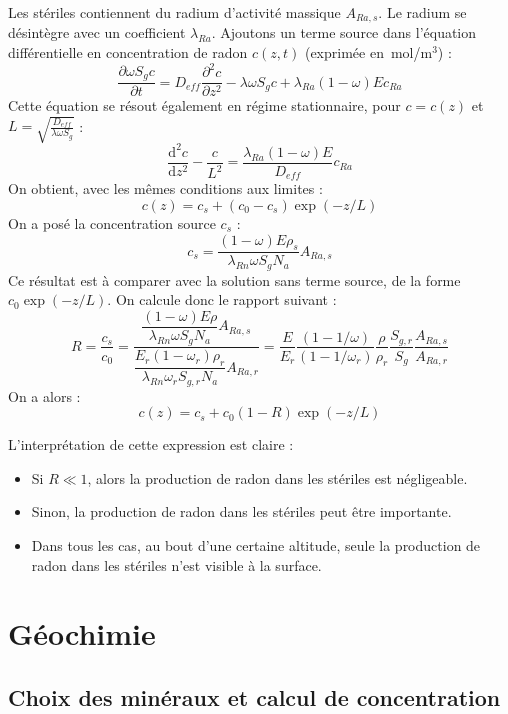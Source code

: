 \documentclass{article}
\begin{document}
Les stériles contiennent du radium d’activité massique $A_{Ra,s}$. Le radium se désintègre avec un coefficient $\lambda_{Ra}$. Ajoutons un terme source dans l’équation différentielle en concentration de radon $c(z,t)$ (exprimée en~mol/m$^3$) :
$$
\frac{\partial \omega S_g c}{\partial t} = D_{eff}  \frac{\partial^2 c}{\partial z^2}-\lambda \omega S_g c + \lambda_{Ra}(1-\omega)E c_{Ra}
$$
Cette équation se résout également en régime stationnaire, pour $c=c(z)$ et $L=\sqrt{\frac{D_{eff}}{\lambda \omega S_g }}$ :
$$
\frac{\text{d}^2 c}{\text{d}z^2} - \frac{c}{L^2}= \frac{\lambda_{Ra}(1-\omega)E}{D_{eff}} c_{Ra}
$$
On obtient, avec les mêmes conditions aux limites :
$$
c(z)= c_s + (c_0 - c_s) \exp(-z/L)
$$
On a posé la concentration source $c_s$ :
$$
c_s = \frac{(1-\omega)E\rho_s}{\lambda_{Rn}\omega S_g N_a} A_{Ra,s} 
$$
Ce résultat est à comparer avec la solution sans terme source, de la forme $c_0 \exp(-z/L)$. On calcule donc le rapport suivant :
$$
R=\dfrac{c_s}{c_0}= \dfrac{\dfrac{(1-\omega)E\rho}{\lambda_{Rn}\omega S_g N_a} A_{Ra,s}}{\dfrac{ E_r (1-\omega_r) \rho_r }{\lambda_{Rn} \omega_r S_{g,r} N_a} A_{Ra,r}} = \frac{E}{E_r} \frac{(1-1/\omega)}{(1-1/\omega_r)} \frac{\rho}{\rho_r} \frac{S_{g,r}}{S_g} \frac{A_{Ra,s}}{A_{Ra,r}}
$$
On a alors :
$$
c(z)=c_s + c_0(1-R) \exp(-z/L)
$$

L'interprétation de cette expression est claire :
\begin{itemize}
  \item Si $R\ll 1$, alors la production de radon dans les stériles est négligeable.
  \item Sinon, la production de radon dans les stériles peut être importante.
  \item Dans tous les cas, au bout d'une certaine altitude, seule la production de radon dans les stériles n'est visible à la surface.
\end{itemize}

\newpage
\section{Géochimie}
\label{annexe:geochimie}

\subsection{Choix des minéraux et calcul de concentration}
\end{document}
